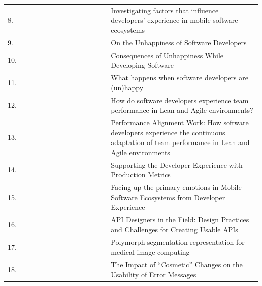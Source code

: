 \documentclass[english, 12pt, a4paper, sci, utf8, a-1b, online]{aaltothesis}
\begin{document}
\begin{center}
\begin{longtable}{p{0.05\linewidth}p{0.35\linewidth}p{0.6\linewidth}}
    8.  & \textcite{fontao2017investigating}                    & Investigating factors that influence developers' experience in mobile software ecosystems                                                   \\
    9.  & \textcite{on-the-unhappiness}                         & On the Unhappiness of Software Developers                                                                                                   \\
    10. & \textcite{consequences-of-unhappiness}                & Consequences of Unhappiness While Developing Software                                                                                       \\
    11. & \textcite{what-happens-when-unhappy}                  & What happens when software developers are (un)happy                                                                                         \\
    12. & \textcite{how-developers-experience-team-performance} & How do software developers experience team performance in Lean and Agile environments?                                                      \\
    13. & \textcite{paw}                                        & Performance Alignment Work: How software developers experience the continuous adaptation of team performance in Lean and Agile environments \\
    14. & \textcite{chatley2019supporting}                      & Supporting the Developer Experience with Production Metrics                                                                                 \\
    15. & \textcite{fontao2017facing}                           & Facing up the primary emotions in Mobile Software Ecosystems from Developer Experience                                                      \\
    16. & \textcite{api-designers}                              & API Designers in the Field: Design Practices and Challenges for Creating Usable APIs                                                        \\
    17. & \textcite{pinter2019polymorph}                        & Polymorph segmentation representation for medical image computing                                                                           \\
    18. & \textcite{dong2019impact}                             & The Impact of ``Cosmetic'' Changes on the Usability of Error Messages                                                                       \\

\end{longtable}
\end{center}
\end{document}
